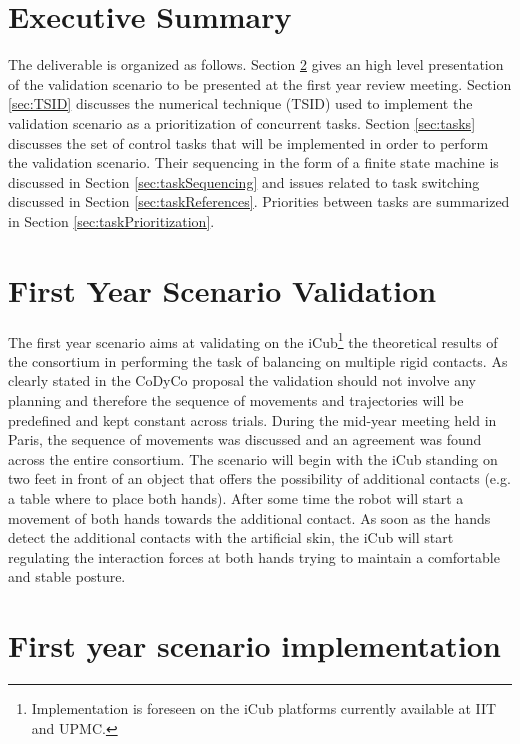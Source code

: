 \documentclass[12pt,a4paper,twoside]{article}
\begin{document}
\section{Executive Summary}

The deliverable is organized as follows. Section \ref{sec:firstYearScenario} gives an high level presentation of the validation scenario to be presented at the first year review meeting. Section \ref{sec:TSID} discusses the numerical technique (TSID) used to implement the validation scenario as a prioritization of concurrent tasks. Section \ref{sec:tasks} discusses the set of control tasks that will be implemented in order to perform the validation scenario.  Their sequencing in the form of a finite state machine is discussed in Section \ref{sec:taskSequencing} and issues related to task switching discussed in Section \ref{sec:taskReferences}. Priorities between tasks are summarized in Section \ref{sec:taskPrioritization}.

\section{First Year Scenario Validation} \label{sec:firstYearScenario}

The first year scenario aims at validating on the iCub\footnote{ Implementation is foreseen on the iCub platforms currently available at IIT and UPMC.} the theoretical results of the consortium in performing the task of balancing on multiple rigid contacts. As clearly stated in the CoDyCo proposal the validation should not involve any planning and therefore the sequence of movements and trajectories will be predefined and kept constant across trials. During the mid-year meeting held in Paris, the sequence of movements was discussed and an agreement was found across the entire consortium. The scenario will begin with the iCub standing on two feet in front of an object that offers the possibility of additional contacts (e.g. a table where to place both hands). After some time the robot will start a movement of both hands towards the additional contact. As soon as the hands detect the additional contacts with the artificial skin, the iCub will start regulating the interaction forces at both hands trying to maintain a comfortable and stable posture.

\section{First year scenario implementation}
\end{document}

